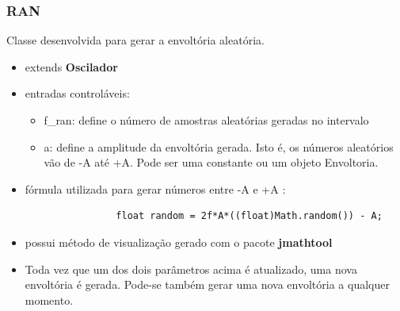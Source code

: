 \documentclass{beamer}
\begin{document}
\begin{frame}[fragile]
	\frametitle{RAN}
Classe desenvolvida para gerar a envoltória aleatória.	
	\begin{itemize}
		\item extends \textbf{Oscilador}
		\item entradas controláveis: 
		\begin{itemize}
			\item f\_ran: define o número de amostras aleatórias geradas no intervalo
			\item a: define a amplitude da envoltória gerada. Isto é, os números aleatórios vão de -A até +A. Pode ser uma constante ou um objeto Envoltoria.
		\end{itemize}
		\item fórmula utilizada para gerar números entre -A e +A :
		\begin{tiny}	\begin{lstlisting}
				float random = 2f*A*((float)Math.random()) - A;		    				
		\end{lstlisting} \end{tiny}	
		
		\item possui método de visualização gerado com o pacote \textbf{jmathtool}					\item Toda vez que um dos dois parâmetros acima é atualizado, uma nova envoltória
		é gerada. Pode-se também gerar uma nova envoltória a qualquer momento.
	\end{itemize}
\end{frame}
\end{document}
